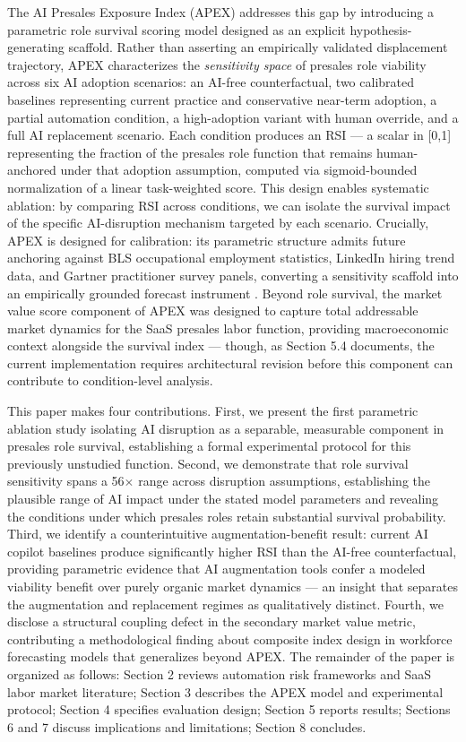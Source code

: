 \documentclass[10pt, conference]{IEEEtran}
\begin{document}
The AI Presales Exposure Index (APEX) addresses this gap by introducing a parametric role survival scoring model designed as an explicit hypothesis-generating scaffold. Rather than asserting an empirically validated displacement trajectory, APEX characterizes the \textit{sensitivity space} of presales role viability across six AI adoption scenarios: an AI-free counterfactual, two calibrated baselines representing current practice and conservative near-term adoption, a partial automation condition, a high-adoption variant with human override, and a full AI replacement scenario. Each condition produces an RSI --- a scalar in [0,1] representing the fraction of the presales role function that remains human-anchored under that adoption assumption, computed via sigmoid-bounded normalization of a linear task-weighted score. This design enables systematic ablation: by comparing RSI across conditions, we can isolate the survival impact of the specific AI-disruption mechanism targeted by each scenario. Crucially, APEX is designed for calibration: its parametric structure admits future anchoring against BLS occupational employment statistics, LinkedIn hiring trend data, and Gartner practitioner survey panels, converting a sensitivity scaffold into an empirically grounded forecast instrument \cite{wiser2021expert}. Beyond role survival, the market value score component of APEX was designed to capture total addressable market dynamics for the SaaS presales labor function, providing macroeconomic context alongside the survival index --- though, as Section 5.4 documents, the current implementation requires architectural revision before this component can contribute to condition-level analysis.

This paper makes four contributions. First, we present the first parametric ablation study isolating AI disruption as a separable, measurable component in presales role survival, establishing a formal experimental protocol for this previously unstudied function. Second, we demonstrate that role survival sensitivity spans a 56$\times$ range across disruption assumptions, establishing the plausible range of AI impact under the stated model parameters and revealing the conditions under which presales roles retain substantial survival probability. Third, we identify a counterintuitive augmentation-benefit result: current AI copilot baselines produce significantly higher RSI than the AI-free counterfactual, providing parametric evidence that AI augmentation tools confer a modeled viability benefit over purely organic market dynamics --- an insight that separates the augmentation and replacement regimes as qualitatively distinct. Fourth, we disclose a structural coupling defect in the secondary market value metric, contributing a methodological finding about composite index design in workforce forecasting models that generalizes beyond APEX. The remainder of the paper is organized as follows: Section 2 reviews automation risk frameworks and SaaS labor market literature; Section 3 describes the APEX model and experimental protocol; Section 4 specifies evaluation design; Section 5 reports results; Sections 6 and 7 discuss implications and limitations; Section 8 concludes.
\end{document}
